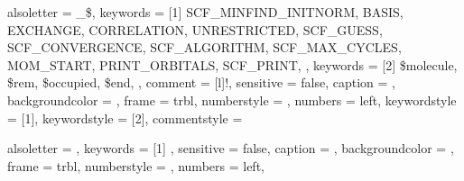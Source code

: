 

{
	alsoletter = {_\$},
	keywords = [1]{
		SCF_MINFIND_INITNORM,
		BASIS,
		EXCHANGE,
		CORRELATION,
		UNRESTRICTED,
		SCF_GUESS,
		SCF_CONVERGENCE,
		SCF_ALGORITHM,
		SCF_MAX_CYCLES,
		MOM_START,
		PRINT_ORBITALS,
		SCF_PRINT,
	},
	keywords = [2]{
		\$molecule,
		\$rem,
		\$occupied,
		\$end,
	},
	comment = [l]{!},
	sensitive = false, %
	caption = \lstname,
	backgroundcolor = \color{Cornsilk},
	frame = trbl,
	numberstyle = \tiny\ttfamily\noncopy, %
	numbers = left,
	keywordstyle = [1]{\color{eclipsePurple}},
	keywordstyle = [2]{\color{Navy}},
	commentstyle = \color{eclipseGreen}
}

\captionsetup[lstlisting]{textfont = tt}

\newcommand*{\qchemsection}[1]{{\color{Navy} \texttt{\$#1}}}
\newcommand*{\qchemremvar}[1]{{\color{eclipsePurple} \texttt{#1}}}


{
	alsoletter = {},
	keywords = [1]{
	},
	sensitive = false, %
	caption = \lstname,
	backgroundcolor = \color{Cornsilk},
	frame = trbl,
	numberstyle = \tiny\ttfamily\noncopy, %
	numbers = left,
}